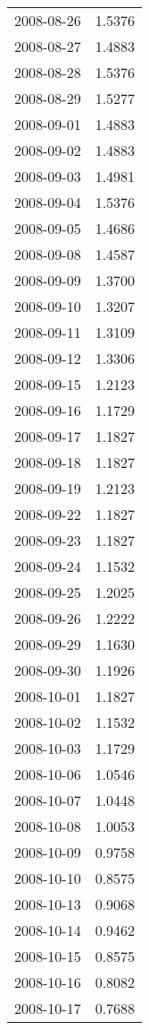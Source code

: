 \begin{tabular}{lr}
2008-08-26 &      1.5376 \\
2008-08-27 &      1.4883 \\
2008-08-28 &      1.5376 \\
2008-08-29 &      1.5277 \\
2008-09-01 &      1.4883 \\
2008-09-02 &      1.4883 \\
2008-09-03 &      1.4981 \\
2008-09-04 &      1.5376 \\
2008-09-05 &      1.4686 \\
2008-09-08 &      1.4587 \\
2008-09-09 &      1.3700 \\
2008-09-10 &      1.3207 \\
2008-09-11 &      1.3109 \\
2008-09-12 &      1.3306 \\
2008-09-15 &      1.2123 \\
2008-09-16 &      1.1729 \\
2008-09-17 &      1.1827 \\
2008-09-18 &      1.1827 \\
2008-09-19 &      1.2123 \\
2008-09-22 &      1.1827 \\
2008-09-23 &      1.1827 \\
2008-09-24 &      1.1532 \\
2008-09-25 &      1.2025 \\
2008-09-26 &      1.2222 \\
2008-09-29 &      1.1630 \\
2008-09-30 &      1.1926 \\
2008-10-01 &      1.1827 \\
2008-10-02 &      1.1532 \\
2008-10-03 &      1.1729 \\
2008-10-06 &      1.0546 \\
2008-10-07 &      1.0448 \\
2008-10-08 &      1.0053 \\
2008-10-09 &      0.9758 \\
2008-10-10 &      0.8575 \\
2008-10-13 &      0.9068 \\
2008-10-14 &      0.9462 \\
2008-10-15 &      0.8575 \\
2008-10-16 &      0.8082 \\
2008-10-17 &      0.7688 \\

\end{tabular}
